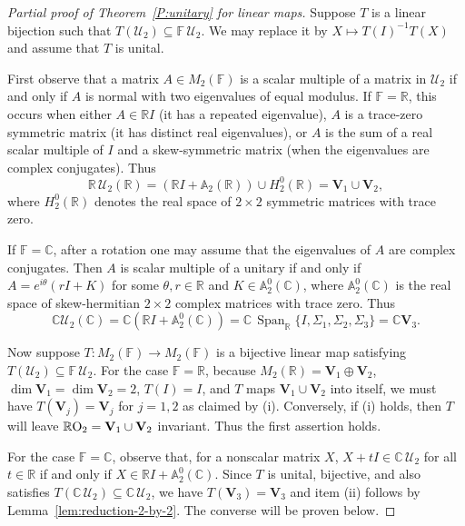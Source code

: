 \documentclass[11pt]{article}
\numberwithin{equation}{section}
\def\IF{{\mathbb F}}
\def\IC{{\mathbb C}}
\def\IR{{\mathbb R}}
\def\IA{{\mathbb A}}
\def\bV{{\mathbf V}}
\def\span{{\mathop{\mathrm{Span}}\nolimits}}
\def\bV{{\mathbf V}}
\begin{document}
\begin{proof}[Partial proof of Theorem~\ref{P:unitary} for linear maps] Suppose $T$ is a linear bijection such that $T({\mathcal U}_2)\subseteq \IF\,{\mathcal U}_2$.
We may replace it by  $X \mapsto T(I)^{-1}T(X)$ and assume that $T$ is unital.

First observe that a matrix $A \in M_2(\IF)$ is a scalar multiple of a  matrix in ${\mathcal U}_2$ if and only if $A$ is normal with two eigenvalues of equal modulus.  If $\IF = \IR$, this occurs when either $A \in \IR I$ (it has a repeated eigenvalue), $A$ is a trace-zero symmetric matrix (it has distinct real eigenvalues), or $A$ is the sum of a real scalar multiple of $I$ and a skew-symmetric matrix (when the eigenvalues are complex conjugates).  Thus
\begin{equation}\label{RU_2}
	\IR\,{\mathcal U}_2(\IR) =  (\IR I + \IA_2(\IR)) \cup H_2^0(\IR) = \textbf{V}_1 \cup \textbf{V}_2,
\end{equation}
where $H_2^0(\IR)$ denotes the real space of $2 \times 2$ symmetric matrices with trace zero.

If $\IF = \IC$, after a rotation one may assume that the eigenvalues of $A$ are  complex conjugates.  Then $A$ is scalar multiple of a unitary if and only if $A = e^{i\theta} (rI + K)$ for some $\theta, r \in \IR$ and $K \in \IA_2^0(\IC)$, where $\IA_2^0(\IC)$ is the real space of skew-hermitian $2 \times 2$ complex matrices with trace zero.  Thus
\begin{equation}\label{CU_2}
	\IC{\mathcal U}_2(\IC) = \IC (\IR I + \IA_2^0(\IC)) =\IC\,\span_{\IR}\{I,\Sigma_1,\Sigma_2,\Sigma_3\}=\IC\bV_3.
\end{equation}

Now suppose $T\colon M_2(\IF) \to M_2(\IF)$ is a bijective linear map satisfying $T({\mathcal U}_2) \subseteq \IF\,{\mathcal U}_2$.  For the case $\IF = \IR$, because $M_2(\IR) = \textbf{V}_1 \oplus \textbf{V}_2$, $\dim \textbf{V}_1 = \dim \textbf{V}_2 = 2$, $T(I)=I$, and $T$ maps $\textbf{V}_1 \cup \textbf{V}_2$ into itself, we must have
$T(\textbf{V}_j) = \textbf{V}_j$ for $j=1,2$
 as claimed by (i).  Conversely, if (i) holds, then $T$ will leave $\IR  {\mathrm O}_2= {\bf V}_1\cup\bV_2$ invariant. Thus the first assertion holds.

For the case $\IF = \IC$, observe that, for a nonscalar matrix $X$, $X + tI \in \IC\, {\mathcal U}_2$ for all $t \in \IR$ if and only if $X \in \IR I + \IA_2^0(\IC)$.
Since $T$ is unital, bijective,  and also satisfies $T(\IC\, {\mathcal U}_2) \subseteq \IC\, {\mathcal U}_2$,
 we have  $T(\bV_3)=\bV_3$ and item (ii) follows by Lemma~\ref{lem:reduction-2-by-2}. The converse will be proven below.
\end{proof}
\end{document}
